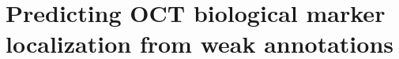 \graphicspath{{appendices/}{oct}{Figures/}}

\chapter{Predicting OCT biological marker localization from weak annotations}

